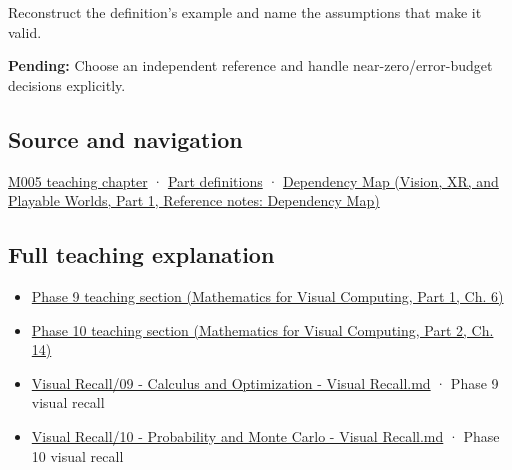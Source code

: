 \hypertarget{appendix-3ae74e89b4e6-recall-and-next-depth}{}

Reconstruct the definition's example and name the assumptions that make it valid.

\textbf{Pending:} Choose an independent reference and handle near-zero/error-budget decisions explicitly.

\subsection{Source and navigation}\label{appendix-3ae74e89b4e6-source-and-navigation}

\hypertarget{appendix-3ae74e89b4e6-source-and-navigation}{}

\hyperref[01-foundations-i-ch001-when-arithmetic-meets-uncertainty]{M005 teaching chapter} · \hyperref[appendix-fd090d982a15-m005---parts-77-88]{Part definitions} · \href{../07-Vision-XR-and-Playable-Worlds-P01/main.pdf\#appendix-4ad47bdd269a}{Dependency Map (Vision, XR, and Playable Worlds, Part 1, Reference notes: Dependency Map)}

\subsection{Full teaching explanation}\label{appendix-3ae74e89b4e6-full-teaching-explanation}

\hypertarget{appendix-3ae74e89b4e6-full-teaching-explanation}{}

\begin{itemize}
\tightlist
\item
  \href{../02-Mathematics-for-Visual-Computing-P01/main.pdf\#02-foundations-ii-ch022-numerical-differentiation-and-automatic-differentiation}{Phase 9 teaching section (Mathematics for Visual Computing, Part 1, Ch. 6)}
\item
  \href{../02-Mathematics-for-Visual-Computing-P02/main.pdf\#02-foundations-ii-ch030-inference-and-error-metrics-need-explicit-assumptions}{Phase 10 teaching section (Mathematics for Visual Computing, Part 2, Ch. 14)}
\item
  \hyperref[appendix-adf48f5dc5c1]{Visual Recall/09 - Calculus and Optimization - Visual Recall.md} · Phase 9 visual recall
\item
  \hyperref[appendix-cb5af353ef77]{Visual Recall/10 - Probability and Monte Carlo - Visual Recall.md} · Phase 10 visual recall
\end{itemize}
